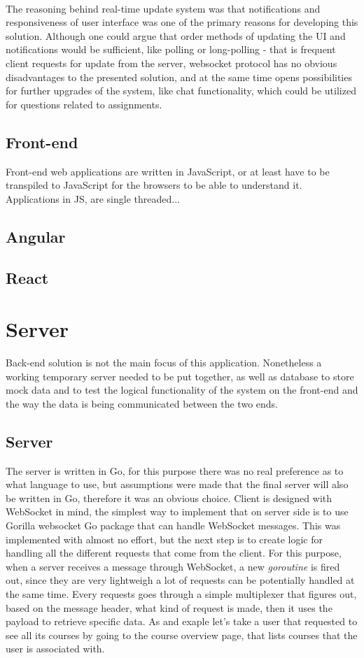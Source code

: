 \\The reasoning behind real-time update system was that notifications and responsiveness of user interface was one of the primary reasons for developing this solution. Although one could argue that order methods of updating the UI and notifications would be sufficient, like polling or long-polling - that is frequent client requests for update from the server, websocket protocol has no obvious disadvantages to the presented solution, and at the same time opens possibilities for further upgrades of the system, like chat functionality, which could be utilized for questions related to assignments.
\subsection{Front-end}
Front-end web applications are written in JavaScript, or at least have to be transpiled to JavaScript for the browsers to be able to understand it. Applications in JS, are single threaded...
\subsection{Angular}
\subsection{React}

\section{Server}
Back-end solution is not the main focus of this application. Nonetheless a working temporary server needed to be put together, as well as database to store mock data and to test the logical functionality of the system on the front-end and the way the data is being communicated between the two ends.
\subsection{Server}
The server is written in Go, for this purpose there was no real  preference as to what language to use, but assumptions were made that the final server will also be written in Go, therefore it was an obvious choice. Client is designed with WebSocket in mind, the simplest way to implement that on server side is to use Gorilla websocket Go package that can handle WebSocket messages. This was implemented with almost no effort, but the next step is to create logic for handling all the different requests that come from the client. For this purpose, when a server receives a message through WebSocket, a new \emph{goroutine} is fired out, since they are very lightweigh a lot of requests can be potentially handled at the same time. Every requests goes through a simple multiplexer that figures out, based on the message header, what kind of request is made, then it uses the payload to retrieve specific data. As and exaple let's take a user that requested to see all its courses by going to the course overview page, that lists courses that the user is associated with.

